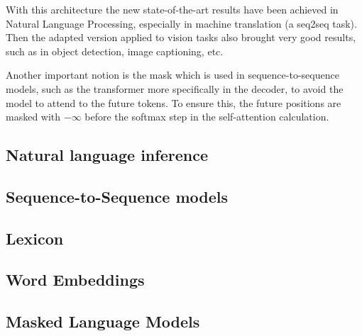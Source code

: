 With this architecture the new state-of-the-art results have been achieved in Natural Language Processing, especially in machine translation (a \gls{seq2seq} task).
Then the adapted version applied to vision tasks also brought very good results, such as in object detection, image captioning, etc.

Another important notion is the mask which is used in sequence-to-sequence models, such as the transformer more specifically in the decoder, to avoid the model to attend to the future tokens.
To ensure this, the future positions are masked with $-\infty$ before the softmax step in the self-attention calculation.


\subsection{Natural language inference}\label{subsec:nli}


\subsection[Seq2Seq]{Sequence-to-Sequence models}\label{subsec:seq2seq}


\subsection{Lexicon}\label{subsec:lexicon}


\subsection{Word Embeddings}\label{subsec:word-embeddings}


\subsection{Masked Language Models}\label{subsec:masked-language-models}

